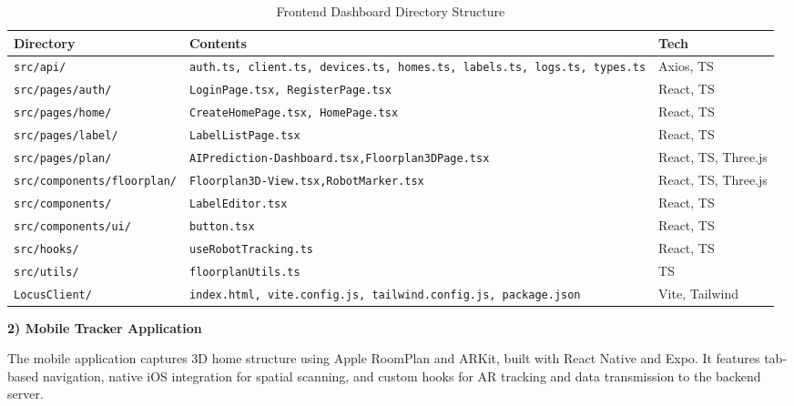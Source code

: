 \documentclass[conference]{IEEEtran}
\begin{document}
\begin{table}[H]
\caption{Frontend Dashboard Directory Structure}
\def\arraystretch{1.2}
\footnotesize
\begin{tabular}{|>{\raggedright\arraybackslash}p{2.6cm}|>{\raggedright\arraybackslash}p{3.5cm}|p{1.4cm}|}
\hline
\textbf{Directory} & \textbf{Contents} & \textbf{Tech} \\
\hline
\texttt{src/api/} & \texttt{auth.ts, client.ts, devices.ts, homes.ts, labels.ts, logs.ts, types.ts} & Axios, TS \\
\hline
\texttt{src/pages/auth/} & \texttt{LoginPage.tsx, RegisterPage.tsx} & React, TS \\
\hline
\texttt{src/pages/home/} & \texttt{CreateHomePage.tsx, HomePage.tsx} & React, TS \\
\hline
\texttt{src/pages/label/} & \texttt{LabelListPage.tsx} & React, TS \\
\hline
\texttt{src/pages/plan/} & \texttt{AIPrediction-}\newline\texttt{Dashboard.tsx,}\newline\texttt{Floorplan3DPage.tsx} & React, TS, Three.js \\
\hline
\texttt{src/components/}\newline\texttt{floorplan/} & \texttt{Floorplan3D-}\newline\texttt{View.tsx,}\newline\texttt{RobotMarker.tsx} & React, TS, Three.js \\
\hline
\texttt{src/components/} & \texttt{LabelEditor.tsx} & React, TS \\
\hline
\texttt{src/components/}\newline\texttt{ui/} & \texttt{button.tsx} & React, TS \\
\hline
\texttt{src/hooks/} & \texttt{useRobotTracking.ts} & React, TS \\
\hline
\texttt{src/utils/} & \texttt{floorplanUtils.ts} & TS \\
\hline
\texttt{LocusClient/} & \texttt{index.html, vite.config.js, tailwind.config.js, package.json} & Vite, Tailwind \\
\hline
\end{tabular}
\end{table}

\textbf{2) Mobile Tracker Application}

The mobile application captures 3D home structure using Apple RoomPlan and ARKit, built with React Native and Expo. It features tab-based navigation, native iOS integration for spatial scanning, and custom hooks for AR tracking and data transmission to the backend server.
\end{document}

